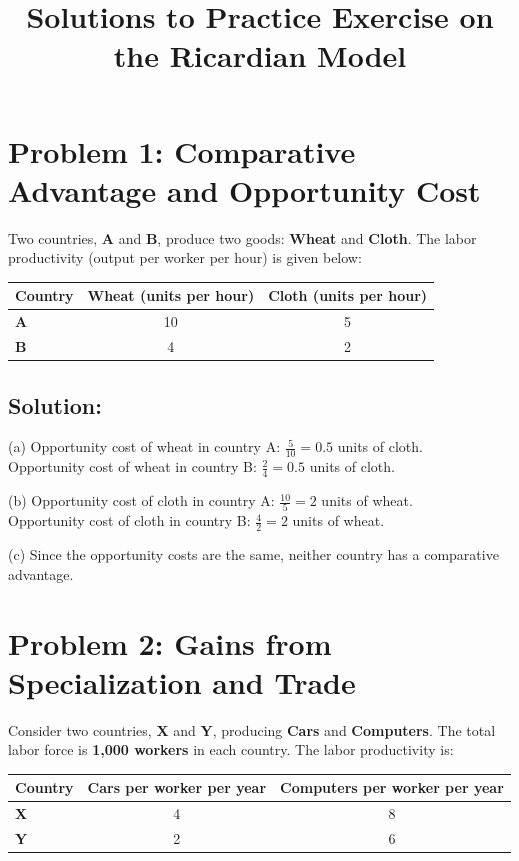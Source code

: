 \documentclass{article}
\begin{document}
\title{Solutions to Practice Exercise on the Ricardian Model}
\author{}
\date{}
\maketitle

\section*{Problem 1: Comparative Advantage and Opportunity Cost}
Two countries, \textbf{A} and \textbf{B}, produce two goods: \textbf{Wheat} and \textbf{Cloth}. The labor productivity (output per worker per hour) is given below:

\begin{table}[h]
    \centering
    \begin{tabular}{lcc}
        \toprule
        Country & Wheat (units per hour) & Cloth (units per hour) \\
        \midrule
        \textbf{A} & 10 & 5 \\
        \textbf{B} & 4 & 2 \\
        \bottomrule
    \end{tabular}
\end{table}

\subsection*{Solution:}
(a) Opportunity cost of wheat in country A: \( \frac{5}{10} = 0.5 \) units of cloth.  \\
Opportunity cost of wheat in country B: \( \frac{2}{4} = 0.5 \) units of cloth.

(b) Opportunity cost of cloth in country A: \( \frac{10}{5} = 2 \) units of wheat.  \\
Opportunity cost of cloth in country B: \( \frac{4}{2} = 2 \) units of wheat.

(c) Since the opportunity costs are the same, neither country has a comparative advantage.

\section*{Problem 2: Gains from Specialization and Trade}
Consider two countries, \textbf{X} and \textbf{Y}, producing \textbf{Cars} and \textbf{Computers}. The total labor force is \textbf{1,000 workers} in each country. The labor productivity is:

\begin{table}[h]
    \centering
    \begin{tabular}{lcc}
        \toprule
        Country & Cars per worker per year & Computers per worker per year \\
        \midrule
        \textbf{X} & 4 & 8 \\
        \textbf{Y} & 2 & 6 \\
        \bottomrule
    \end{tabular}
\end{table}
\end{document}
